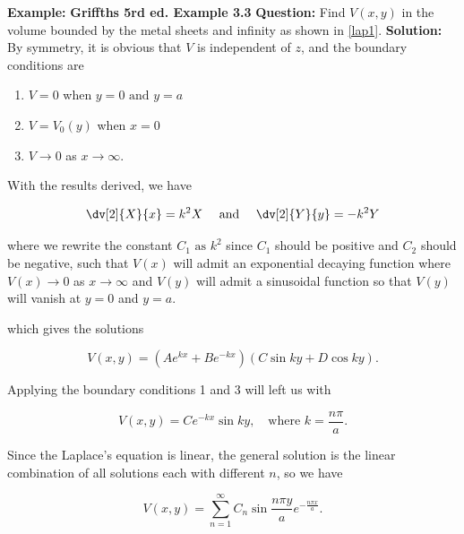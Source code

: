 \documentclass[a4paper,12pt]{report}
\begin{document}
	
	\begin{example_template}
		\textbf{Example:} \textbf{Griffths 5rd ed. Example 3.3} \newline \newline
		\textbf{Question:}  Find \(V(x,y)\) in the volume bounded by the metal sheets and infinity as shown in \cref{lap1}.    \newline \newline
		\textbf{Solution:} By symmetry, it is obvious that \(V\) is independent of \(z\), and the boundary conditions are
				
		\begin{enumerate}
			\item \(V = 0\) when \(y = 0 \text { and }  y = a\)
			\item \(V = V_0(y)\) when \(x = 0\)
			\item \(V \rightarrow  0\) as \(x \rightarrow  \infty\).
		\end{enumerate}
		
		With the results derived, we have
		
		\begin{equation}
			\dv[2]{X}{x} = k^2X ~~~ \text{ and } ~~~ \dv[2]{Y}{y} = -k^2Y
		\end{equation}

		where we rewrite the constant \(C_1 \text{ as } k^2\) since \(C_1\) should be positive and  \(C_2\) should be negative, such that \(V(x)\) will admit an exponential decaying function where \(V(x) \rightarrow 0\) as \(x \rightarrow \infty\) and \(V(y)\) will admit a sinusoidal function so that \(V(y)\) will vanish at \(y = 0\) and \(y = a\).            
		
		which gives the solutions
		
		\begin{equation}
			V(x,y) = (A e^{kx} + B e^{-kx} )(C\sin ky+D\cos ky) .
		\end{equation}
		
		Applying the boundary conditions 1 and 3 will left us with 
		
		\begin{equation}
			V(x,y) = C e^{-kx} \sin ky, ~~~ \text{ where } k = \frac{n\pi }{a}. 
		\end{equation}
		
		Since the Laplace's equation is linear, the general solution is the linear combination of all solutions each with different \(n\), so we have 
		
		\begin{equation}
			V(x,y) = \sum_{n=1}^{\infty} C_{n} \sin \frac{n\pi y}{a} e^{-\frac{n\pi x}{a}} .
		\end{equation}
		

\end{example_template}
\end{document}
